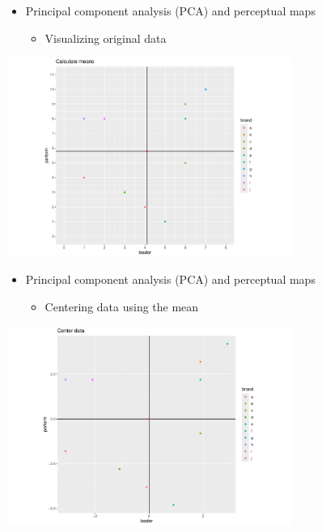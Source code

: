 \documentclass[
  ignorenonframetext,
]{beamer}
\providecommand{\tightlist}{%
  \setlength{\itemsep}{0pt}\setlength{\parskip}{0pt}}\usepackage{longtable,booktabs,array}
\begin{document}
\begin{frame}{}
\label{section-12}
\begin{itemize}
\item
  Principal component analysis (PCA) and perceptual maps

  \begin{itemize}
  \tightlist
  \item
    Visualizing original data
  \end{itemize}
\end{itemize}

\begin{center}
\includegraphics[width=0.7\textwidth,height=\textheight]{008_reducing_data_complexity_files/figure-beamer/unnamed-chunk-11-1.pdf}
\end{center}
\end{frame}

\begin{frame}{}
\label{section-13}
\begin{itemize}
\item
  Principal component analysis (PCA) and perceptual maps

  \begin{itemize}
  \tightlist
  \item
    Centering data using the mean
  \end{itemize}
\end{itemize}

\begin{center}
\includegraphics[width=0.7\textwidth,height=\textheight]{008_reducing_data_complexity_files/figure-beamer/unnamed-chunk-12-1.pdf}
\end{center}
\end{frame}
\end{document}
